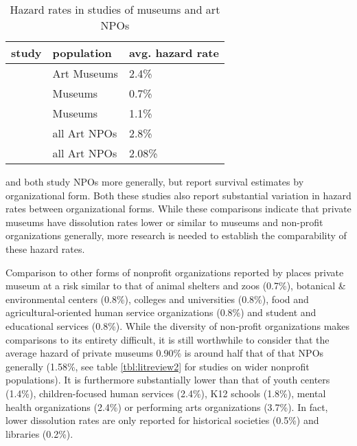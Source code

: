 \documentclass[12pt]{article}
\begin{document}
\begin{table}[htbp]
\caption{\label{tbl:litreview}Hazard rates in studies of museums and art NPOs}
\centering
\begin{tabular}{lll}
\hline
study & population & avg. hazard rate\\
\hline
\cite{Hager_2001_vulnerability} & Art Museums & 2.4\%\\
\cite{Gordon_etal_2013_insolvency} & Museums & 0.7\%\\
\cite{Bowen_1994_charitable} & Museums & 1.1\%\\
\hline
\cite{Hager_2001_vulnerability} & all Art NPOs & 2.8\%\\
\cite{Gordon_etal_2013_insolvency} & all Art NPOs & 2.08\%\\
\hline
\end{tabular}
\end{table}

\textcite{Hager_2001_vulnerability} and \textcite{Gordon_etal_2013_insolvency} both study NPOs more generally, but report survival estimates by organizational form.
Both these studies also report substantial variation in hazard rates between organizational forms.
While these comparisons indicate that private museums have dissolution rates lower or similar to museums and non-profit organizations generally, more research is needed to establish the comparability of these hazard rates.


Comparison to other forms of nonprofit organizations reported by \parencite{Gordon_etal_2013_insolvency}
places private museum at a risk similar to that of animal shelters and zoos (0.7\%), botanical \& environmental centers (0.8\%), colleges and universities (0.8\%), food and agricultural-oriented human service organizations (0.8\%) and  student and educational services (0.8\%).
While the diversity of non-profit organizations makes comparisons to its entirety difficult, it is still worthwhile to consider that the average hazard of private museums 0.90\% is around half that of that NPOs generally (1.58\%, see table \ref{tbl:litreview2} for studies on wider nonprofit populations).
It is furthermore substantially lower than that of youth centers (1.4\%), children-focused human services (2.4\%), K12 schools (1.8\%), mental health organizations (2.4\%) or performing arts organizations (3.7\%).
In fact, lower dissolution rates are only reported for historical societies (0.5\%) and libraries (0.2\%).
\end{document}
